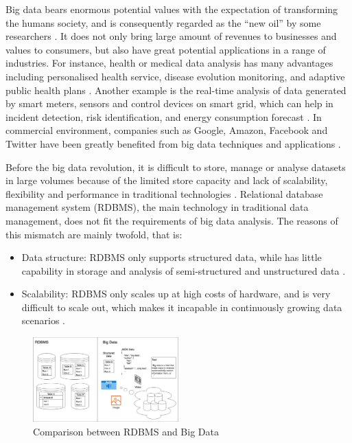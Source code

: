 \documentclass[conference]{IEEEtran}
\let\oldincludegraphics\includegraphics
\renewcommand{\includegraphics}[1]{\oldincludegraphics[width=0.5\textwidth,keepaspectratio]{#1}}
\providecommand{\tightlist}{%
  \setlength{\itemsep}{0pt}\setlength{\parskip}{0pt}
}
\begin{document}
Big data bears enormous potential values with the expectation of
transforming the humans society, and is consequently regarded as the
``new oil'' by some researchers \autocite{hu2014}. It does not only
bring large amount of revenues to businesses and values to consumers,
but also have great potential applications in a range of industries. For
instance, health or medical data analysis has many advantages including
personalised health service, disease evolution monitoring, and adaptive
public health plans \autocite{OUSSOUS2018431}. Another example is the
real-time analysis of data generated by smart meters, sensors and
control devices on smart grid, which can help in incident detection,
risk identification, and energy consumption forecast
\autocite{OUSSOUS2018431}. In commercial environment, companies such as
Google, Amazon, Facebook and Twitter have been greatly benefited from
big data techniques and applications \autocite{Hewage2018}.

Before the big data revolution, it is difficult to store, manage or
analyse datasets in large volumes because of the limited store capacity
and lack of scalability, flexibility and performance in traditional
technologies \autocite{OUSSOUS2018431}. Relational database management
system (RDBMS), the main technology in traditional data management, does
not fit the requirements of big data analysis. The reasons of this
mismatch are mainly twofold, that is:

\begin{itemize}
\tightlist
\item
  Data structure: RDBMS only supports structured data, while has little
  capability in storage and analysis of semi-structured and unstructured
  data \autocite{hu2014}.
\item
  Scalability: RDBMS only scales up at high costs of hardware, and is
  very difficult to scale out, which makes it incapable in continuously
  growing data scenarios \autocite{hu2014,SIVARAJAH2017}.
\end{itemize}

\begin{figure}
\hypertarget{fig:compare}{%
\centering
\includegraphics{img/big-data-rdbms.png}
\caption{Comparison between RDBMS and Big Data}\label{fig:compare}
}
\end{figure}
\end{document}
